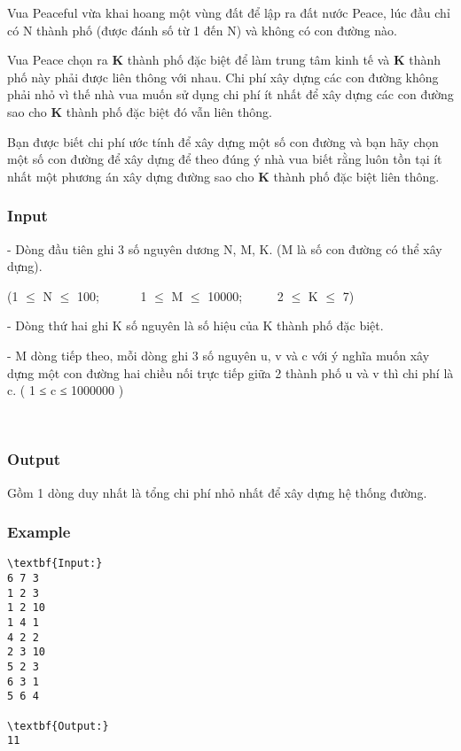 

Vua Peaceful vừa khai hoang một vùng đất để lập ra đất nước Peace, lúc đầu chỉ có N thành phố (được đánh số từ 1 đến N) và không có con đường nào.

Vua Peace chọn ra \textbf{ K } thành phố đặc biệt để làm trung tâm kinh tế và \textbf{ K } thành phố này phải được liên thông với nhau. Chi phí xây dựng các con đường không phải nhỏ vì thế nhà vua muốn sử dụng chi phí ít nhất để xây dựng các con đường sao cho \textbf{ K } thành phố đặc biệt đó vẫn liên thông.

Bạn được biết chi phí ước tính để xây dựng một số con đường và bạn hãy chọn một số con đường để xây dựng để theo đúng ý nhà vua biết rằng luôn tồn tại ít nhất một phương án xây dựng đường sao cho \textbf{ K } thành phố đặc biệt liên thông.

\subsubsection{Input}

- Dòng đầu tiên ghi 3 số nguyên dương N, M, K. (M là số con đường có thể xây dựng).

(1  $\le$  N  $\le$  100;       1  $\le$  M  $\le$  10000;      2  $\le$  K  $\le$  7)

- Dòng thứ hai ghi K số nguyên là số hiệu của K thành phố đặc biệt.

- M dòng tiếp theo, mỗi dòng ghi 3 số nguyên u, v và c với ý nghĩa muốn xây dựng một con đường hai chiều nối trực tiếp giữa 2 thành phố u và v thì chi phí là c. ( 1 ≤ c ≤ 1000000 )

 

\subsubsection{Output}

Gồm 1 dòng duy nhất là tổng chi phí nhỏ nhất để xây dựng hệ thống đường.

\subsubsection{Example}
\begin{verbatim}
\textbf{Input:}
6 7 3
1 2 3
1 2 10
1 4 1
4 2 2
2 3 10
5 2 3
6 3 1
5 6 4

\textbf{Output:}
11

\end{verbatim}
